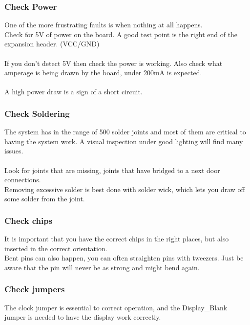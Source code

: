 \documentclass{ol-softwaremanual}
\begin{document}
\begin{ffcode}
\subsubsection{Check Power}
One of the more frustrating faults is when nothing at all happens.\\
Check for 5V of power on the board. A good test point is the right end of the expansion header. (VCC/GND)\\
\\
If you don't detect 5V then check the power is working. Also check what amperage is being drawn by the board, under 200mA is expected.\\
\\
A high power draw is a sign of a short circuit.\\

\subsubsection{Check Soldering}
The system has in the range of 500 solder joints and most of them are critical to having the system work. A visual inspection under good lighting will find many issues.\\
\\
Look for joints that are missing, joints that have bridged to a next door connections.\\

Removing excessive solder is best done with solder wick, which lets you draw off some solder from the joint.

\subsubsection{Check chips}
It is important that you have the correct chips in the right places, but also inserted in the correct orientation.\\

Bent pins can also happen, you can often straighten pins with tweezers. Just be aware that the pin will never be as strong and might bend again.
\\
\subsubsection{Check jumpers}
The clock jumper is essential to correct operation, and the Display\_Blank jumper is needed to have the display work correctly.\\

\pagebreak

\end{ffcode}
\end{document}
